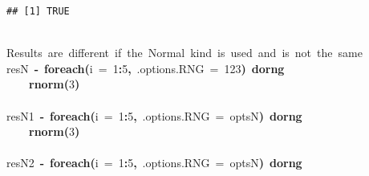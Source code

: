 \documentclass[a4paper,12pt]{article}\usepackage{graphicx, color}
\makeatletter
\newcommand{\hlnumber}[1]{\textcolor[rgb]{0,0,0}{#1}}%
\newcommand{\hlfunctioncall}[1]{\textcolor[rgb]{0.501960784313725,0,0.329411764705882}{\textbf{#1}}}%
\newcommand{\hlkeyword}[1]{\textcolor[rgb]{0,0,0}{\textbf{#1}}}%
\newcommand{\hlargument}[1]{\textcolor[rgb]{0.690196078431373,0.250980392156863,0.0196078431372549}{#1}}%
\newcommand{\hlcomment}[1]{\textcolor[rgb]{0.180392156862745,0.6,0.341176470588235}{#1}}%
\newcommand{\hlassignement}[1]{\textcolor[rgb]{0,0,0}{\textbf{#1}}}%
\newcommand{\hlsymbol}[1]{\textcolor[rgb]{0,0,0}{#1}}%
\newcommand{\hlstd}[1]{\textcolor[rgb]{0,0,0}{#1}}%
\newenvironment{kframe}{%
 \def\FrameCommand##1{\hskip\@totalleftmargin \hskip-\fboxsep
 \colorbox{shadecolor}{##1}\hskip-\fboxsep
     \hskip-\linewidth \hskip-\@totalleftmargin \hskip\columnwidth}%
 \MakeFramed {\advance\hsize-\width
   \@totalleftmargin\z@ \linewidth\hsize
   \@setminipage}}%
 {\par\unskip\endMakeFramed}
\newenvironment{knitrout}{}{} %
\renewenvironment{knitrout}{\begin{footnotesize}}{\end{footnotesize}}
\makeatother
\begin{document}
\begin{description}
\begin{knitrout}
\begin{kframe}
\begin{verbatim}
## [1] TRUE
\end{verbatim}
\begin{flushleft}
\ttfamily\noindent
\hspace*{\fill}\\
\hlstd{}\hlcomment{\usebox{\hlnormalsizeboxhash}{\ }Results{\ }are{\ }different{\ }if{\ }the{\ }Normal{\ }kind{\ }is{\ }used{\ }and{\ }is{\ }not{\ }the{\ }same}\hspace*{\fill}\\
\hlstd{}\hlsymbol{resN}{\ }\hlassignement{\usebox{\hlnormalsizeboxlessthan}-}{\ }\hlfunctioncall{foreach}\hlkeyword{(}\hlargument{i}{\ }\hlargument{=}{\ }\hlnumber{1}\hlkeyword{:}\hlnumber{5}\hlkeyword{,}{\ }\hlargument{.options.RNG}{\ }\hlargument{=}{\ }\hlnumber{123}\hlkeyword{)}{\ }\hlkeyword{\usebox{\hlnormalsizeboxpercent}dorng\usebox{\hlnormalsizeboxpercent}}{\ }\hlkeyword{\usebox{\hlnormalsizeboxopenbrace}}\hspace*{\fill}\\
\hlstd{}{\ }{\ }{\ }{\ }\hlfunctioncall{rnorm}\hlkeyword{(}\hlnumber{3}\hlkeyword{)}\hspace*{\fill}\\
\hlstd{}\hlkeyword{\usebox{\hlnormalsizeboxclosebrace}}\hspace*{\fill}\\
\hlstd{}\hlsymbol{resN1}{\ }\hlassignement{\usebox{\hlnormalsizeboxlessthan}-}{\ }\hlfunctioncall{foreach}\hlkeyword{(}\hlargument{i}{\ }\hlargument{=}{\ }\hlnumber{1}\hlkeyword{:}\hlnumber{5}\hlkeyword{,}{\ }\hlargument{.options.RNG}{\ }\hlargument{=}{\ }\hlsymbol{optsN}\hlkeyword{)}{\ }\hlkeyword{\usebox{\hlnormalsizeboxpercent}dorng\usebox{\hlnormalsizeboxpercent}}{\ }\hlkeyword{\usebox{\hlnormalsizeboxopenbrace}}\hspace*{\fill}\\
\hlstd{}{\ }{\ }{\ }{\ }\hlfunctioncall{rnorm}\hlkeyword{(}\hlnumber{3}\hlkeyword{)}\hspace*{\fill}\\
\hlstd{}\hlkeyword{\usebox{\hlnormalsizeboxclosebrace}}\hspace*{\fill}\\
\hlstd{}\hlsymbol{resN2}{\ }\hlassignement{\usebox{\hlnormalsizeboxlessthan}-}{\ }\hlfunctioncall{foreach}\hlkeyword{(}\hlargument{i}{\ }\hlargument{=}{\ }\hlnumber{1}\hlkeyword{:}\hlnumber{5}\hlkeyword{,}{\ }\hlargument{.options.RNG}{\ }\hlargument{=}{\ }\hlsymbol{optsN}\hlkeyword{)}{\ }\hlkeyword{\usebox{\hlnormalsizeboxpercent}dorng\usebox{\hlnormalsizeboxpercent}}{\ }\hlkeyword{\usebox{\hlnormalsizeboxopenbrace}}\hspace*{\fill}\\

\end{flushleft}
\end{kframe}
\end{knitrout}
\end{description}
\end{document}
